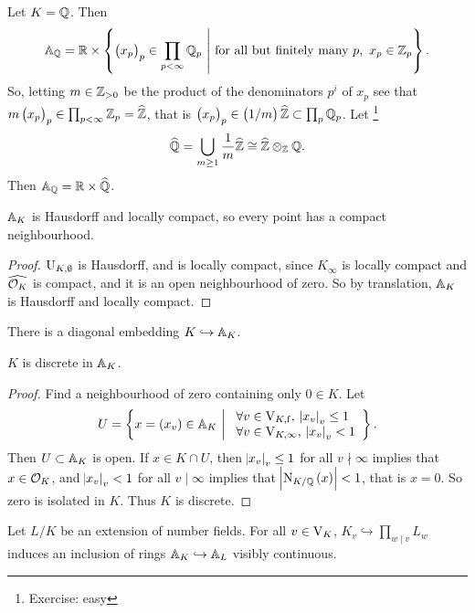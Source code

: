 \begin{example*}
Let $ K = \QQ $. Then
$$ \AA_\QQ = \RR \times \cbr{\br{x_p}_p \in \prod_{p < \infty} \QQ_p \st \text{for all but finitely many} \ p, \ x_p \in \ZZ_p}. $$
So, letting $ m \in \ZZ_{> 0} $ be the product of the denominators $ p^i $ of $ x_p $ see that $ m\br{x_p}_p \in \prod_{p < \infty} \ZZ_p = \widehat{\ZZ} $, that is $ \br{x_p}_p \in \br{1 / m}\widehat{\ZZ} \subset \prod_p \QQ_p $. Let \footnote{Exercise: easy}
$$ \widehat{\QQ} = \bigcup_{m \ge 1} \dfrac{1}{m}\widehat{\ZZ} \cong \widehat{\ZZ} \otimes_\ZZ \QQ. $$
Then $ \AA_\QQ = \RR \times \widehat{\QQ} $.
\end{example*}

\pagebreak

\begin{proposition}
$ \AA_K $ is Hausdorff and locally compact, so every point has a compact neighbourhood.
\end{proposition}

\begin{proof}
$ \U_{K, \emptyset} $ is Hausdorff, and is locally compact, since $ K_\infty $ is locally compact and $ \widehat{\OOO_K} $ is compact, and it is an open neighbourhood of zero. So by translation, $ \AA_K $ is Hausdorff and locally compact.
\end{proof}

There is a diagonal embedding $ K \hookrightarrow \AA_K $.

\begin{proposition}
$ K $ is discrete in $ \AA_K $.
\end{proposition}

\begin{proof}
Find a neighbourhood of zero containing only $ 0 \in K $. Let
$$ U = \cbr{x = \br{x_v} \in \AA_K \st \begin{array}{l} \forall v \in \V_{K, \f}, \ \abs{x_v}_v \le 1 \\ \forall v \in \V_{K, \infty}, \ \abs{x_v}_v < 1 \end{array}}. $$
Then $ U \subset \AA_K $ is open. If $ x \in K \cap U $, then $ \abs{x_v}_v \le 1 $ for all $ v \nmid \infty $ implies that $ x \in \OOO_K $, and $ \abs{x_v}_v < 1 $ for all $ v \mid \infty $ implies that $ \abs{\N_{K / \QQ}\br{x}} < 1 $, that is $ x = 0 $. So zero is isolated in $ K $. Thus $ K $ is discrete.
\end{proof}


Let $ L / K $ be an extension of number fields. For all $ v \in \V_K $, $ K_v \hookrightarrow \prod_{w \mid v} L_w $ induces an inclusion of rings $ \AA_K \hookrightarrow \AA_L $ visibly continuous.

